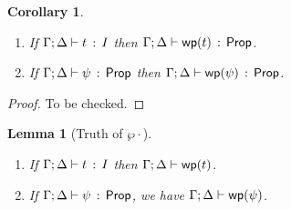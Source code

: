\documentclass[10pt,a4paper]{article}
\newtheorem{lemma}[theorem]{Lemma}
\newtheorem{corollary}[theorem]{Corollary}
\begin{document}
\begin{corollary}
\mbox{}
\begin{enumerate}
\item If $\Gamma;\Delta \vdash t\, :\, I$ then
  $\Gamma;\Delta \vdash \mathop{\mathsf{wp}}(t)\, :\, \mathsf{Prop}$.
\item If $\Gamma;\Delta \vdash \psi\, :\, \mathsf{Prop}$ then
  $\Gamma;\Delta \vdash \mathop{\mathsf{wp}}(\psi)\, :\, \mathsf{Prop}$.
\end{enumerate}
\end{corollary}

\begin{proof}
To be checked.
\end{proof}

\clearpage

\begin{lemma}[Truth of $\wp{\cdot}$]
\mbox{}
  \begin{enumerate}
  \item If $\Gamma;\Delta \vdash t\, :\, I$ then
    $\Gamma;\Delta \vdash \mathop{\mathsf{wp}}(t)$.
  \item If $\Gamma;\Delta \vdash \psi\, :\, \mathsf{Prop}$, we have
    $\Gamma;\Delta \vdash \mathop{\mathsf{wp}}(\psi)$.
  \end{enumerate}
\end{lemma}
\end{document}
